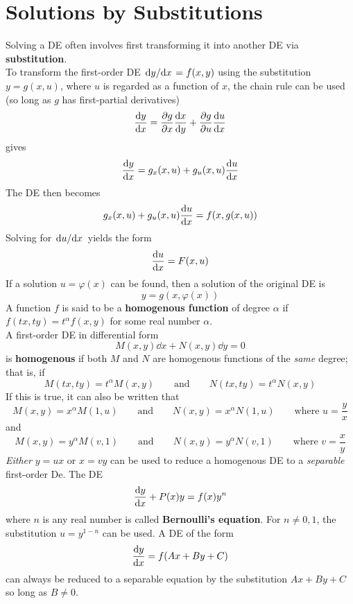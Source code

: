 \documentclass[./Differential Equations.tex]{subfiles}
\begin{document}
	\section{Solutions by Substitutions}
			Solving a DE often involves first transforming it into another DE via \textbf{substitution}. \\
			To transform the first-order DE \(\dv*{y}{x} = f(x, y)\) using the substitution \(y = g(x, u)\), where \(u\) is regarded as a function of \(x\), the chain rule can be used (so long as \(g\) has first-partial derivatives)
				\[\dv{y}{x} = \pdv{g}{x}\dv{x}{y} + \pdv{g}{u}\dv{u}{x}\]
				gives
					\[\dv{y}{x} = g_x(x, u) + g_u(x, u)\dv{u}{x}\]
				The DE then becomes
				\[g_x(x, u) + g_u(x, u)\dv{u}{x} = f(x, g(x, u))\]
				Solving for \(\dv*{u}{x}\) yields the form
				\[\dv{u}{x} = F(x, u)\]
				If a solution \(u = \varphi(x)\) can be found, then a solution of the original DE is
				\[y = g(x, \varphi(x))\]
			A function \(f\) is said to be a \textbf{homogenous function} of degree \(\alpha\) if \(f(tx, ty) = t^\alpha f(x, y)\) for some real number \(\alpha\). \\
			A first-order DE in differential form
				\[M(x, y)\dd{x} + N(x, y)\dd{y} = 0\]
				is \textbf{homogenous} if both \(M\) and \(N\) are homogenous functions of the \textit{same} degree; that is, if
				\[
					M(tx, ty) = t^\alpha M(x, y) \qquad \text{and} \qquad
						N(tx, ty) = t^\alpha N(x, y)
				\]
				If this is true, it can also be written that
					\[
						M(x, y) = x^\alpha M(1, u) \qquad \text{and} \qquad
							N(x, y) = x^\alpha N(1, u) \qquad 
							\text{where } u = \frac{y}{x}
					\]
					and
					\[
						M(x, y) = y^\alpha M(v, 1) \qquad \text{and} \qquad
							N(x, y) = y^\alpha N(v, 1) \qquad
							\text{where } v = \frac{x}{y}
					\]
			\textit{Either} \(y = ux\) or \(x = vy\) can be used to reduce a homogenous DE to a \textit{separable} first-order De.
			The DE
				\[\dv{y}{x} + P(x)y = f(x)y^n\]
				where \(n\) is any real number is called \textbf{Bernoulli's equation}. For \(n \ne 0, 1\), the substitution \(u = y^{1 - n}\) can be used.
			A DE of the form
				\[\dv{y}{x} = f(Ax + By + C)\]
					can always be reduced to a separable equation by the substitution \(Ax + By + C\) so long as \(B \ne 0\).
\end{document}
